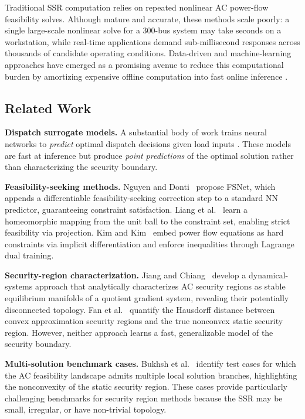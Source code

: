 \documentclass[journal]{IEEEtran}
\begin{document}
Traditional SSR computation relies on repeated nonlinear AC power-flow
feasibility solves. Although mature and accurate, these methods scale poorly:
a single large-scale nonlinear solve for a 300-bus system may take seconds on a workstation,
while real-time applications demand sub-millisecond responses across thousands
of candidate operating conditions. Data-driven and machine-learning approaches
have emerged as a promising avenue to reduce this computational burden by
amortizing expensive offline computation into fast online inference
\cite{donti2021machine,pan2023deepopf}.

\subsection{Related Work}

\textbf{Dispatch surrogate models.} A substantial body of work trains neural
networks to \emph{predict} optimal dispatch decisions given load inputs
\cite{pan2023deepopf,chen2022learning}. These models are fast at inference but
produce \emph{point predictions} of the optimal solution rather than
characterizing the security boundary.

\textbf{Feasibility-seeking methods.} Nguyen and Donti~\cite{nguyen2025fsnet}
propose FSNet, which appends a differentiable feasibility-seeking correction
step to a standard NN predictor, guaranteeing constraint satisfaction.
Liang et al.~\cite{liang2023homeomorphic} learn a homeomorphic mapping from the
unit ball to the constraint set, enabling strict feasibility via projection.
Kim and Kim~\cite{kim2025deeplagrange} embed power flow equations as hard
constraints via implicit differentiation and enforce inequalities through
Lagrange dual training.

\textbf{Security-region characterization.} Jiang and Chiang~\cite{jiang2017feasibility}
develop a dynamical-systems approach that analytically characterizes AC
security regions as stable equilibrium manifolds of a quotient gradient
system, revealing their potentially disconnected topology. Fan et
al.~\cite{fan2024error} quantify the Hausdorff distance between convex
approximation security regions and the true nonconvex static security
region. However, neither approach learns a fast, generalizable model of the
security boundary.

\textbf{Multi-solution benchmark cases.} Bukhsh et al.~\cite{bukhsh2013local} identify
test cases for which the AC feasibility landscape admits multiple local
solution branches, highlighting the nonconvexity of the static security region. These
cases provide particularly challenging benchmarks for security region methods
because the SSR may be small, irregular, or have non-trivial topology.
\end{document}
